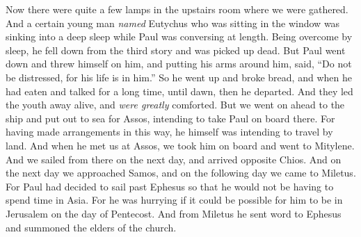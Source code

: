 \begin{biblechapter}
\verse Now there were quite a few lamps in the upstairs room where we were gathered.
\verse And a certain young man \textit{named} Eutychus who was sitting in the window was sinking into a deep sleep while Paul was conversing at length. Being overcome by sleep, he fell down from the third story and was picked up dead.
\verse But Paul went down and threw himself on him, and putting his arms around him, said, “Do not be distressed, for his life is in him.”
\verse So he went up and broke bread, and when he had eaten and talked for a long time, until dawn, then he departed.
\verse And they led the youth away alive, and \textit{were greatly} comforted.
 But we went on ahead to the ship and put out to sea for Assos, intending to take Paul on board there. For having made arrangements in this way, he himself was intending to travel by land.
\verse And when he met us at Assos, we took him on board and went to Mitylene.
\verse And we sailed from there on the next day, and arrived opposite Chios. And on the next day we approached Samos, and on the following day we came to Miletus.
\verse For Paul had decided to sail past Ephesus so that he would not be having to spend time in Asia. For he was hurrying if it could be possible for him to be in Jerusalem on the day of Pentecost.
 And from Miletus he sent word to Ephesus and summoned the elders of the church.

\end{biblechapter}
